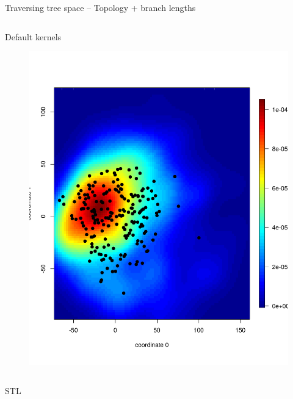 \documentclass[newPxFont,numfooter,sectionpages]{beamer}
\begin{document}
\begin{frame}{Traversing tree space -- Topology + branch lengths}
 \begin{column}{0.5\textwidth}
 \begin{center}
   Default kernels
\begin{figure}
	\includegraphics[width=\textwidth]{figures/mds_BHV_default_denv4.pdf}
\end{figure}
 \end{center}
\end{column}
 \begin{column}{0.5\textwidth}
  \begin{center}
  STL
\begin{figure}

\end{figure}
\end{center}
\end{column}
\end{frame}
\end{document}
